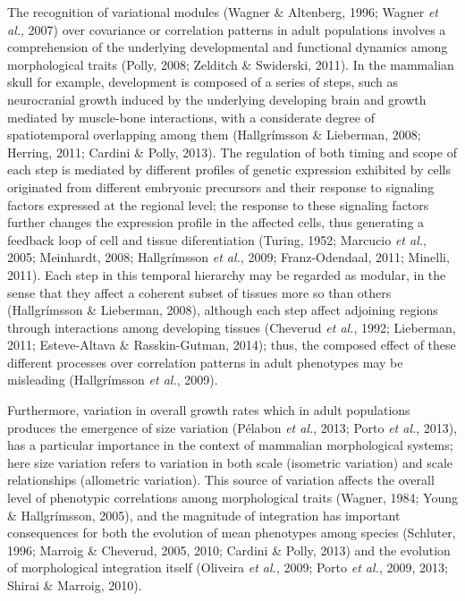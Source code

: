 \documentclass[12pt,]{article}
\begin{document}
The recognition of variational modules (Wagner \& Altenberg, 1996;
Wagner \emph{et al.}, 2007) over covariance or correlation patterns in
adult populations involves a comprehension of the underlying
developmental and functional dynamics among morphological traits (Polly,
2008; Zelditch \& Swiderski, 2011). In the mammalian skull for example,
development is composed of a series of steps, such as neurocranial
growth induced by the underlying developing brain and growth mediated by
muscle-bone interactions, with a considerate degree of spatiotemporal
overlapping among them (Hallgrímsson \& Lieberman, 2008; Herring, 2011;
Cardini \& Polly, 2013). The regulation of both timing and scope of each
step is mediated by different profiles of genetic expression exhibited
by cells originated from different embryonic precursors and their
response to signaling factors expressed at the regional level; the
response to these signaling factors further changes the expression
profile in the affected cells, thus generating a feedback loop of cell
and tissue diferentiation (Turing, 1952; Marcucio \emph{et al.}, 2005;
Meinhardt, 2008; Hallgrímsson \emph{et al.}, 2009; Franz-Odendaal, 2011;
Minelli, 2011). Each step in this temporal hierarchy may be regarded as
modular, in the sense that they affect a coherent subset of tissues more
so than others (Hallgrímsson \& Lieberman, 2008), although each step
affect adjoining regions through interactions among developing tissues
(Cheverud \emph{et al.}, 1992; Lieberman, 2011; Esteve-Altava \&
Rasskin-Gutman, 2014); thus, the composed effect of these different
processes over correlation patterns in adult phenotypes may be
misleading (Hallgrímsson \emph{et al.}, 2009).

Furthermore, variation in overall growth rates which in adult
populations produces the emergence of size variation (Pélabon \emph{et
al.}, 2013; Porto \emph{et al.}, 2013), has a particular importance in
the context of mammalian morphological systems; here size variation
refers to variation in both scale (isometric variation) and scale
relationships (allometric variation). This source of variation affects
the overall level of phenotypic correlations among morphological traits
(Wagner, 1984; Young \& Hallgrímsson, 2005), and the magnitude of
integration has important consequences for both the evolution of mean
phenotypes among species (Schluter, 1996; Marroig \& Cheverud, 2005,
2010; Cardini \& Polly, 2013) and the evolution of morphological
integration itself (Oliveira \emph{et al.}, 2009; Porto \emph{et al.},
2009, 2013; Shirai \& Marroig, 2010).
\end{document}
